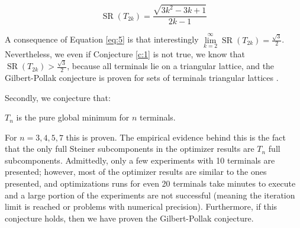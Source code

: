 \documentclass{mpaper}
\begin{document}
\begin{equation} \label{eq:5}
  \operatorname{SR}(T_{2k}) = \frac{\sqrt{3k^2 -3k + 1}}{2 k - 1}
\end{equation}

A consequence of Equation \ref{eq:5} is that interestingly $\allowbreak\lim\limits_{k=2}^\infty \allowbreak\operatorname{SR}(T_{2k})=\frac{\sqrt{3}}{2}$. Nevertheless, we even if Conjecture \ref{c:1} is not true, we know that $\operatorname{SR}(T_{2k})>\frac{\sqrt{3}}{2}$, because all terminals lie on a triangular lattice, and the Gilbert-Pollak conjecture is proven for sets of terminals triangular lattices \cite{po}.

Secondly, we conjecture that:

\begin{conjecture}\label{c:2}
  $T_n$ is the pure global minimum for $n$ terminals.
\end{conjecture}

For $n=3,4,5,7$ this is proven. The empirical evidence behind this is the fact that the only full Steiner subcomponents in the optimizer results are $T_n$ full subcomponents. Admittedly, only a few experiments with 10 terminals are presented; however, most of the optimizer results are similar to the ones presented, and optimizations runs for even 20 terminals take minutes to execute and a large portion of the experiments are not successful (meaning the iteration limit is reached or problems with numerical precision). Furthermore, if this conjecture holds, then we have proven the Gilbert-Pollak conjecture. 






\end{document}

